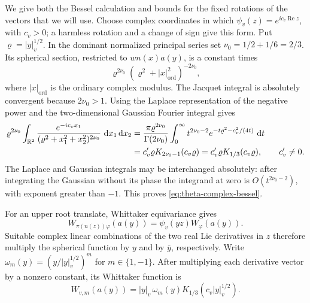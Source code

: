 We give both the Bessel calculation and bounds for the fixed rotations
of the vectors that we will use.  Choose complex coordinates in which
\(\psi_v(z)=e^{i c_v\operatorname{Re}z}\), with \(c_v>0\); a harmless
rotation and a change of sign give this form.  Put \(\varrho=|y|_v^{1/2}\).
In the dominant normalized principal series set
\(\nu_0=1/2+1/6=2/3\).  Its spherical section, restricted to
\(wn(x)a(y)\), is a constant times
\[
 \varrho^{2\nu_0}(\varrho^2+|x|_{\mathrm{ord}}^2)^{-2\nu_0},
\]
where \(|x|_{\mathrm{ord}}\) is the ordinary complex modulus.  The
Jacquet integral is absolutely convergent because \(2\nu_0>1\).
Using the Laplace representation of the negative power and the
two-dimensional Gaussian Fourier integral gives
\begin{align*}
 \varrho^{2\nu_0}\int_{\mathbb{R}^2}
   \frac{e^{-ic_v x_1}}{(\varrho^2+x_1^2+x_2^2)^{2\nu_0}}
     \,\,\mathrm{d} x_1\,\mathrm{d} x_2
 &=\frac{\pi \varrho^{2\nu_0}}{\Gamma(2\nu_0)}
     \int_0^\infty t^{2\nu_0-2}
       e^{-t\varrho^2-c_v^2/(4t)}\,\,\mathrm{d} t\\
 &=c'_v \varrho K_{2\nu_0-1}(c_v\varrho)
  =c'_v \varrho K_{1/3}(c_v\varrho),\qquad c'_v\ne0.
\end{align*}
The Laplace and Gaussian integrals may be interchanged absolutely:
after integrating the Gaussian without its phase the integrand at
zero is \(O(t^{2\nu_0-2})\), with exponent greater than \(-1\).
This proves \eqref{eq:theta-complex-bessel}.

For an upper root translate, Whittaker equivariance gives
\begin{equation}\label{eq:theta-lie-multiplier}
 W_{\pi(n(z))\varphi}(a(y))=\psi_v(yz)W_\varphi(a(y)).
\end{equation}
Suitable complex linear combinations of the two real Lie derivatives
in \(z\) therefore multiply the spherical function by \(y\) and by
\(\bar y\), respectively.  Write
\(\omega_m(y)=(y/|y|_v^{1/2})^m\) for \(m\in\{1,-1\}\).
After multiplying each derivative vector by a nonzero constant, its
Whittaker function is
\begin{equation}\label{eq:theta-complex-derivative}
 W_{v,m}(a(y))
   =|y|_v\,\omega_m(y)K_{1/3}(c_v|y|_v^{1/2}).
\end{equation}

